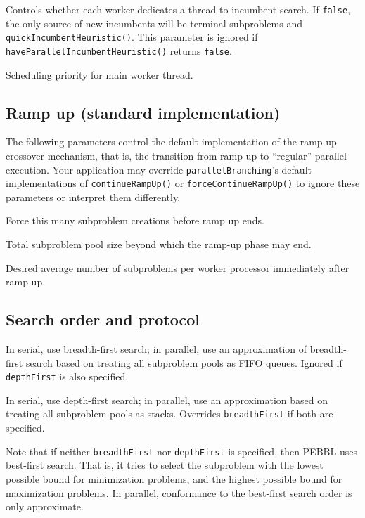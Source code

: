 Controls whether each worker dedicates a thread to incumbent search.
If \texttt{false}, the only source of new incumbents will be terminal
subproblems and  \texttt{quickIncumbentHeuristic()}.  This
parameter is ignored if \texttt{haveParallelIncumbentHeuristic()}
returns \texttt{false}.

Scheduling priority for main worker thread.


\subsection{Ramp up (standard implementation)}
The following parameters control the default implementation of the
ramp-up crossover mechanism, that is, the transition from ramp-up to
``regular'' parallel execution.  Your application may override
\texttt{parallelBranching}'s default implementations of
\texttt{continueRampUp()} or \texttt{forceContinueRampUp()} to ignore
these parameters or interpret them differently.

Force this many subproblem creations before ramp up ends.

Total subproblem pool size beyond which the ramp-up phase may end.

Desired average number of subproblems per worker processor
immediately after ramp-up.


\subsection{Search order and protocol}
\label{sec:searchparams}
\vspace{-3ex}
In serial, use breadth-first search; in parallel, use an approximation
of breadth-first search based on treating all subproblem pools as FIFO
queues.  Ignored if \texttt{depthFirst} is also specified.

In serial, use depth-first search; in
parallel, use an approximation based on treating all
subproblem pools as stacks.  Overrides \texttt{breadthFirst} if both
are specified.

\vspace{2ex}

Note that if neither \texttt{breadthFirst} nor \texttt{depthFirst} is
specified, then PEBBL uses best-first search.  That is, it tries to
select the subproblem with the lowest possible bound for minimization
problems, and the highest possible bound for maximization problems.
In parallel, conformance to the best-first search order is only approximate.

